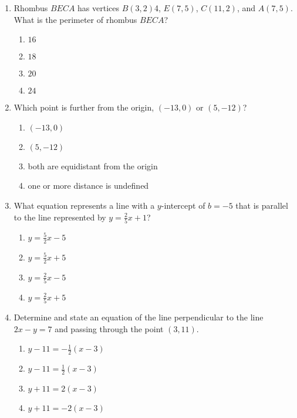 \documentclass[12pt, twoside]{article}
\begin{document}
\begin{enumerate}
\item Rhombus $BECA$ has vertices $B(3,2)$4, $E(7,5)$, $C(11,2)$, and $A(7,5)$. What is the perimeter of rhombus $BECA$?
  \begin{multicols}{2}
    \begin{enumerate}
      \item $16$
      \item $18$ 
      \item $20$
      \item $24$
    \end{enumerate}
  \end{multicols}

\item Which point is further from the origin, $(-13,0)$ or $(5,-12)$?
  \begin{multicols}{2}
    \begin{enumerate}
      \item $(-13,0)$
      \item $(5,-12)$ 
      \item both are equidistant from the origin
      \item one or more distance is undefined
    \end{enumerate}
  \end{multicols}

\item What equation represents a line with a $y$-intercept of $b=-5$ that is parallel to the line represented by $y=\frac{2}{5}x+1$?
  \begin{multicols}{2}
    \begin{enumerate}
      \item $y=\frac{5}{2}x-5$
      \item $y=\frac{5}{2}x+5$
      \item $y=\frac{2}{5}x-5$
      \item $y=\frac{2}{5}x+5$
    \end{enumerate}
  \end{multicols}

\item Determine and state an equation of the line perpendicular to the line\\ $2x-y=7$ and passing through the point $(3,11)$.
  \begin{multicols}{2}
    \begin{enumerate}
      \item $y-11=-\frac{1}{2}(x-3)$
      \item $y-11=\frac{1}{2}(x-3)$ 
      \item $y+11=2(x-3)$
      \item $y+11=-2(x-3)$
    \end{enumerate}
  \end{multicols}


\end{enumerate}
\end{document}
